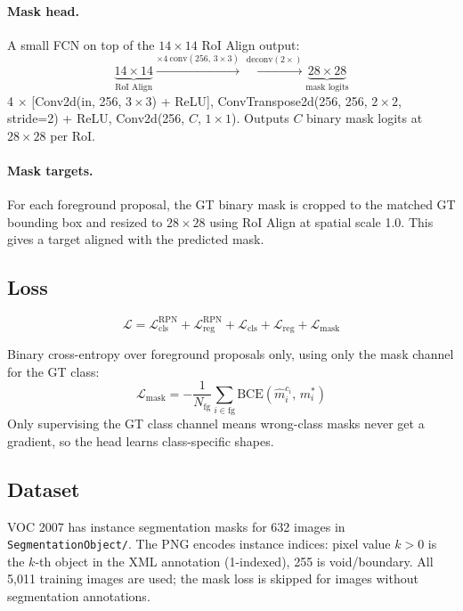\documentclass[11pt]{article}
\begin{document}
\paragraph{Mask head.}
A small FCN on top of the $14\times14$ RoI Align output:
\begin{equation}
    \underbrace{14 \times 14}_{\text{RoI Align}} \xrightarrow{\times 4\ \text{conv}(256,\, 3\times3)} \xrightarrow{\text{deconv}(2\times)} \underbrace{28 \times 28}_{\text{mask logits}}
\end{equation}
4 $\times$ [Conv2d(in, 256, $3\times3$) + ReLU], ConvTranspose2d(256, 256, $2\times2$, stride=2) + ReLU, Conv2d(256, $C$, $1\times1$). Outputs $C$ binary mask logits at $28\times28$ per RoI.

\paragraph{Mask targets.}
For each foreground proposal, the GT binary mask is cropped to the matched GT bounding box and resized to $28\times28$ using RoI Align at spatial scale 1.0. This gives a target aligned with the predicted mask.

\subsection{Loss}

\begin{equation}
    \mathcal{L} = \mathcal{L}_\text{cls}^\text{RPN} + \mathcal{L}_\text{reg}^\text{RPN} + \mathcal{L}_\text{cls} + \mathcal{L}_\text{reg} + \mathcal{L}_\text{mask}
\end{equation}

Binary cross-entropy over foreground proposals only, using only the mask channel for the GT class:
\begin{equation}
    \mathcal{L}_\text{mask} = -\frac{1}{N_\text{fg}} \sum_{i \in \text{fg}} \text{BCE}\!\left(\hat{m}_i^{c_i},\, m_i^*\right)
\end{equation}
Only supervising the GT class channel means wrong-class masks never get a gradient, so the head learns class-specific shapes.

\subsection{Dataset}

VOC 2007 has instance segmentation masks for 632 images in \texttt{SegmentationObject/}. The PNG encodes instance indices: pixel value $k > 0$ is the $k$-th object in the XML annotation (1-indexed), 255 is void/boundary. All 5,011 training images are used; the mask loss is skipped for images without segmentation annotations.
\end{document}
